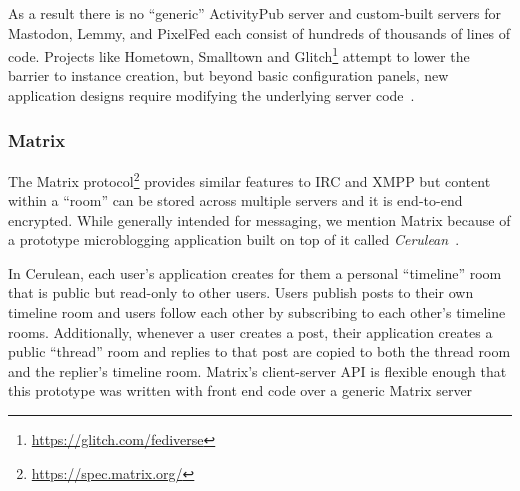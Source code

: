 As a result there is no ``generic'' ActivityPub server
and custom-built servers
for Mastodon, Lemmy, and PixelFed each consist of hundreds
of thousands of lines of code.
Projects like Hometown, Smalltown and Glitch\footnote{
    \url{https://glitch.com/fediverse}
} attempt to lower the barrier
to instance creation, but beyond basic configuration panels,
new application designs require modifying the underlying server code~\cite{smalltown,runyourownsocial}.




\subsubsection{Matrix}

The Matrix protocol\footnote{
    \url{https://spec.matrix.org/}
}
provides similar features to IRC and XMPP but content within a ``room''
can be stored across multiple servers and it is end-to-end encrypted.
While generally intended for messaging, we mention Matrix because of a
prototype microblogging application built on top of it called \emph{Cerulean}~\cite{cerulean}.

In Cerulean, each user's application creates for them a
personal ``timeline'' room that is public but read-only
to other users. Users publish posts to their own timeline room
and users follow each other by subscribing to each other's timeline rooms.
Additionally, whenever a user creates a post, their application creates a
public ``thread'' room and replies to that post are copied to both the
thread room and the replier's timeline room.
Matrix's client-server API is flexible enough that this prototype
was written with front end code over a generic Matrix server

